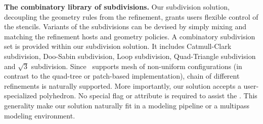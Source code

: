 \noindent\textbf{The combinatory library of subdivisions.}
Our subdivision solution, decoupling the geometry rules from the
refinement, grants users flexible control of the stencils.
Variants of the subdivisions can be devised by simply mixing
and matching the refinement hosts and geometry policies.
A combinatory subdivision set is provided within our subdivision
solution. It includes Catmull-Clark subdivision, Doo-Sabin 
subdivision, Loop subdivision, Quad-Triangle subdivision and
$\sqrt{3}$ subdivision. Since
\cgalpoly\ supports mesh of non-uniform configurations 
(in contrast to the quad-tree or patch-based 
implementation), chain of different refinements
is naturally supported.
More importantly, our solution accepts a user-specialized 
polyhedron. No special flag or attribute is required 
to assist the \tr . This generality make our solution 
naturally fit in a modeling pipeline or a multipass modeling 
environment. 


 
